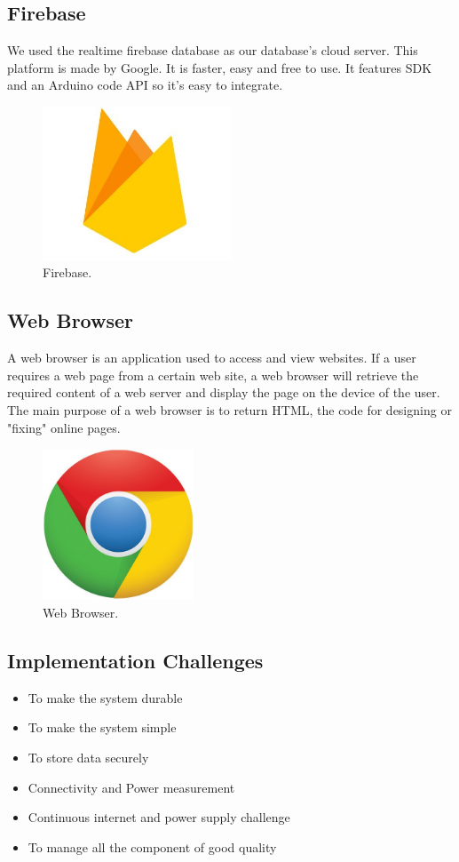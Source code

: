 \subsection{Firebase}
We used the realtime firebase database as our database's cloud server. This platform is made by Google. It is faster, easy and free to use. It features SDK and an Arduino code API so it's easy to integrate.
\begin{figure}[H]
\centering
\includegraphics[width=0.5\textwidth]{figures/Firebase real.jpg}
\caption{Firebase.}
\label{Firebase}
\end{figure}
\subsection{Web Browser}
A web browser is an application used to access and view websites. If a user requires a web page from a certain web site, a web browser will retrieve the required content of a web server and display the page on the device of the user. The main purpose of a web browser is to return HTML, the code for designing or "fixing" online pages.
\begin{figure}[H]
\centering
\includegraphics[width=0.4\textwidth]{figures/Web Browser.jpg}
\caption{Web Browser.}
\label{Web Browser}
\end{figure}
\subsection{Implementation Challenges}
\begin{itemize}
    \item To make the system durable
    \item To make the system simple
    \item To store data securely 
    \item Connectivity and Power measurement
    \item Continuous internet and power supply challenge
    \item To manage all the component of good quality
\end{itemize}


